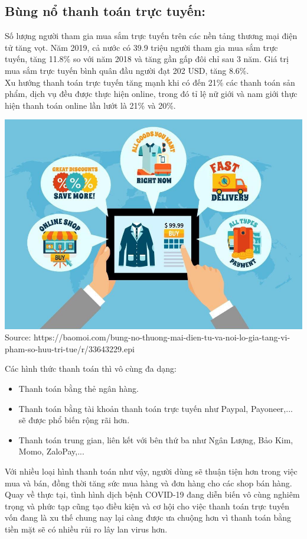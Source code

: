 \documentclass[13pt,a4paper]{article}
\begin{document}
\subsection{Bùng nổ thanh toán trực tuyến:}
Số lượng người tham gia mua sắm trực tuyến trên các nền tảng thương mại điện tử tăng vọt. Năm 2019, cả nước có 39.9 triệu người tham gia mua sắm trực tuyến, tăng 11.8\% so với năm 2018 và tăng gần gấp đôi chỉ sau 3 năm. Giá trị mua sắm trực tuyến bình quân đầu người đạt 202 USD, tăng 8.6\%.\\
Xu hướng thanh toán trực tuyến tăng mạnh khi có đến 21\% các thanh toán sản phẩm, dịch vụ đều được thực hiện online, trong đó tỉ lệ nữ giới và nam giới thực hiện thanh toán online lần lướt là 21\% và 20\%.\\
\begin{center}
\includegraphics[scale=0.3]{images/bungno.jpg}\\
\fontsize{10pt}{1.2pt}\selectfont
Source: https://baomoi.com/bung-no-thuong-mai-dien-tu-va-noi-lo-gia-tang-vi-pham-so-huu-tri-tue/r/33643229.epi
\end{center}
Các hình thức thanh toán thì vô cùng đa dạng:
\begin{itemize}
\item Thanh toán bằng thẻ ngân hàng.\\
\item Thanh toán bằng tài khoản thanh toán trực tuyến như Paypal, Payoneer,... sẽ được phổ biến rộng rãi hơn.\\
\item Thanh toán trung gian, liên kết với bên thứ ba như Ngân Lượng, Bảo Kim, Momo, ZaloPay,...
\end{itemize}
Với nhiều loại hình thanh toán như vậy, người dùng sẽ thuận tiện hơn trong việc mua và bán, đồng thời tăng sức mua hàng và đơn hàng cho các shop bán hàng.\\
Quay về thực tại, tình hình dịch bệnh COVID-19 đang diễn biến vô cùng nghiêm trọng và phức tạp cũng tạo điều kiện và cơ hội cho việc thanh toán trực tuyến vốn đang là xu thế chung nay lại càng được ưa chuộng hơn vì thanh toán bằng tiền mặt sẽ có nhiều rủi ro lây lan virus hơn.
\end{document}
